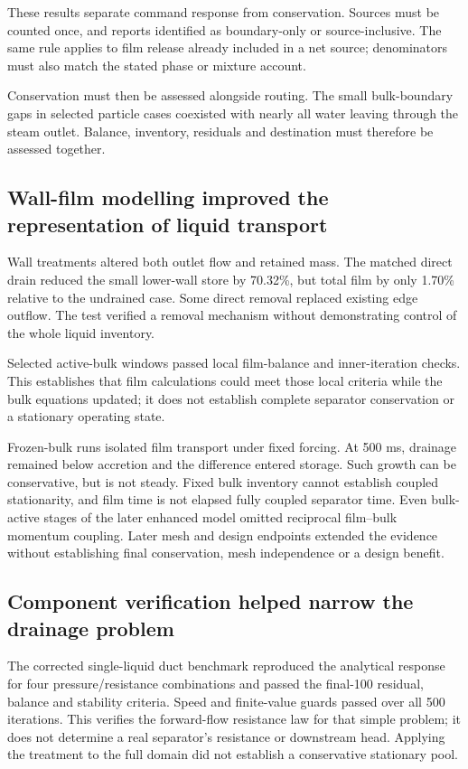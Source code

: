 These results separate command response from conservation. Sources must be counted once, and reports identified as boundary-only or source-inclusive. The same rule applies to film release already included in a net source; denominators must also match the stated phase or mixture account.

Conservation must then be assessed alongside routing. The small bulk-boundary gaps in selected particle cases coexisted with nearly all water leaving through the steam outlet. Balance, inventory, residuals and destination must therefore be assessed together.

\subsection{Wall-film modelling improved the representation of liquid transport}

Wall treatments altered both outlet flow and retained mass. The matched direct drain reduced the small lower-wall store by 70.32\%, but total film by only 1.70\% relative to the undrained case. Some direct removal replaced existing edge outflow. The test verified a removal mechanism without demonstrating control of the whole liquid inventory.

Selected active-bulk windows passed local film-balance and inner-iteration checks. This establishes that film calculations could meet those local criteria while the bulk equations updated; it does not establish complete separator conservation or a stationary operating state.

Frozen-bulk runs isolated film transport under fixed forcing. At 500 ms, drainage remained below accretion and the difference entered storage. Such growth can be conservative, but is not steady. Fixed bulk inventory cannot establish coupled stationarity, and film time is not elapsed fully coupled separator time. Even bulk-active stages of the later enhanced model omitted reciprocal film--bulk momentum coupling. Later mesh and design endpoints extended the evidence without establishing final conservation, mesh independence or a design benefit.

\subsection{Component verification helped narrow the drainage problem}

The corrected single-liquid duct benchmark reproduced the analytical response for four pressure/resistance combinations and passed the final-100 residual, balance and stability criteria. Speed and finite-value guards passed over all 500 iterations. This verifies the forward-flow resistance law for that simple problem; it does not determine a real separator's resistance or downstream head. Applying the treatment to the full domain did not establish a conservative stationary pool.

